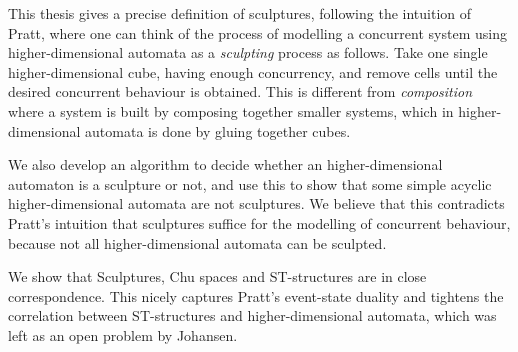     This thesis gives a precise definition of sculptures, following the intuition of Pratt, where one can think of the process of modelling a concurrent system using higher-dimensional automata as a \emph{sculpting} process as follows. Take one single higher-dimensional cube, having enough concurrency, and remove cells until the desired concurrent behaviour is obtained. This is different from \emph{composition} where a system is built by composing together smaller systems, which in higher-dimensional automata is done by gluing together cubes.
    
    We also develop an algorithm to decide whether an higher-dimensional automaton is a sculpture or not, and use this to show that some simple acyclic higher-dimensional automata are not sculptures. We believe that this contradicts Pratt's intuition that sculptures suffice for the modelling of concurrent behaviour, because not all higher-dimensional automata can be sculpted.
    
    We show that Sculptures, Chu spaces and ST-structures are in close correspondence. This nicely captures Pratt's event-state duality and tightens the correlation between ST-structures and higher-dimensional automata, which was left as an open problem by Johansen.

    
    
